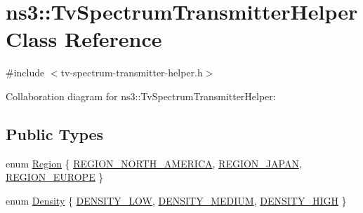 \hypertarget{classns3_1_1TvSpectrumTransmitterHelper}{}\section{ns3\+:\+:Tv\+Spectrum\+Transmitter\+Helper Class Reference}
\label{classns3_1_1TvSpectrumTransmitterHelper}


{\ttfamily \#include $<$tv-\/spectrum-\/transmitter-\/helper.\+h$>$}



Collaboration diagram for ns3\+:\+:Tv\+Spectrum\+Transmitter\+Helper\+:
\subsection*{Public Types}
\begin{DoxyCompactItemize}
\item 
enum \hyperlink{classns3_1_1TvSpectrumTransmitterHelper_a7b4aafcd25156458e9ec922587169bbe}{Region} \{ \hyperlink{classns3_1_1TvSpectrumTransmitterHelper_a7b4aafcd25156458e9ec922587169bbea056d73a4fde73ff587515aba0b9f0178}{R\+E\+G\+I\+O\+N\+\_\+\+N\+O\+R\+T\+H\+\_\+\+A\+M\+E\+R\+I\+CA}, 
\hyperlink{classns3_1_1TvSpectrumTransmitterHelper_a7b4aafcd25156458e9ec922587169bbeaa08d9e0f51ad5b6a6230db87ed8b2176}{R\+E\+G\+I\+O\+N\+\_\+\+J\+A\+P\+AN}, 
\hyperlink{classns3_1_1TvSpectrumTransmitterHelper_a7b4aafcd25156458e9ec922587169bbeaa28b9c30091d0f924883332dd748e796}{R\+E\+G\+I\+O\+N\+\_\+\+E\+U\+R\+O\+PE}
 \}
\item 
enum \hyperlink{classns3_1_1TvSpectrumTransmitterHelper_a71a2f35d9d4b50ea4840a18bfba6dba7}{Density} \{ \hyperlink{classns3_1_1TvSpectrumTransmitterHelper_a71a2f35d9d4b50ea4840a18bfba6dba7a85fe28ac3b33f00d0a1bb919b69f60d9}{D\+E\+N\+S\+I\+T\+Y\+\_\+\+L\+OW}, 
\hyperlink{classns3_1_1TvSpectrumTransmitterHelper_a71a2f35d9d4b50ea4840a18bfba6dba7a73f07e5c6ddd8eaae068f515708620d2}{D\+E\+N\+S\+I\+T\+Y\+\_\+\+M\+E\+D\+I\+UM}, 
\hyperlink{classns3_1_1TvSpectrumTransmitterHelper_a71a2f35d9d4b50ea4840a18bfba6dba7ad9c97c2b8b6f17857b6c7d7f2f0d807d}{D\+E\+N\+S\+I\+T\+Y\+\_\+\+H\+I\+GH}
 \}
\end{DoxyCompactItemize}
